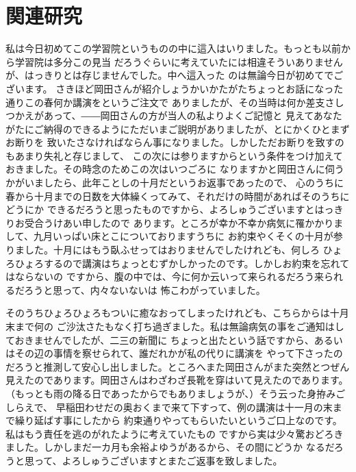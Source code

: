 \chapter{関連研究}
  私は今日初めてこの学習院というものの中に這入はいりました。もっとも以前から学習院は多分この見当
  だろうぐらいに考えていたには相違そういありませんが、はっきりとは存じませんでした。中へ這入った
  のは無論今日が初めてでございます。
  さきほど岡田さんが紹介しょうかいかたがたちょっとお話になった通りこの春何か講演をというご注文で
  ありましたが、その当時は何か差支さしつかえがあって、――岡田さんの方が当人の私よりよくご記憶と
  見えてあなたがたにご納得のできるようにただいまご説明がありましたが、とにかくひとまずお断りを
  致いたさなければならん事になりました。しかしただお断りを致すのもあまり失礼と存じまして、
  この次には参りますからという条件をつけ加えておきました。その時念のためこの次はいつごろに
  なりますかと岡田さんに伺うかがいましたら、此年ことしの十月だというお返事であったので、
  心のうちに春から十月までの日数を大体繰くってみて、それだけの時間があればそのうちにどうにか
  できるだろうと思ったものですから、よろしゅうございますとはっきりお受合うけあい申したので
  あります。ところが幸か不幸か病気に罹かかりまして、九月いっぱい床とこについておりますうちに
  お約束やくそくの十月が参りました。十月にはもう臥ふせってはおりませんでしたけれども、何しろ
  ひょろひょろするので講演はちょっとむずかしかったのです。しかしお約束を忘れてはならないの
  ですから、腹の中では、今に何か云いって来られるだろう来られるだろうと思って、内々ないないは
  怖こわがっていました。

  そのうちひょろひょろもついに癒なおってしまったけれども、こちらからは十月末まで何の
  ご沙汰さたもなく打ち過ぎました。私は無論病気の事をご通知はしておきませんでしたが、二三の新聞に
  ちょっと出たという話ですから、あるいはその辺の事情を察せられて、誰だれかが私の代りに講演を
  やって下さったのだろうと推測して安心し出しました。ところへまた岡田さんがまた突然とつぜん
  見えたのであります。岡田さんはわざわざ長靴を穿はいて見えたのであります。
  （もっとも雨の降る日であったからでもありましょうが、）そう云った身拵みごしらえで、
  早稲田わせだの奥おくまで来て下すって、例の講演は十一月の末まで繰り延ばす事にしたから
  約束通りやってもらいたいというご口上なのです。私はもう責任を逃のがれたように考えていたもの
  ですから実は少々驚おどろきました。しかしまだ一カ月も余裕よゆうがあるから、その間にどうか
  なるだろうと思って、よろしゅうございますとまたご返事を致しました。


